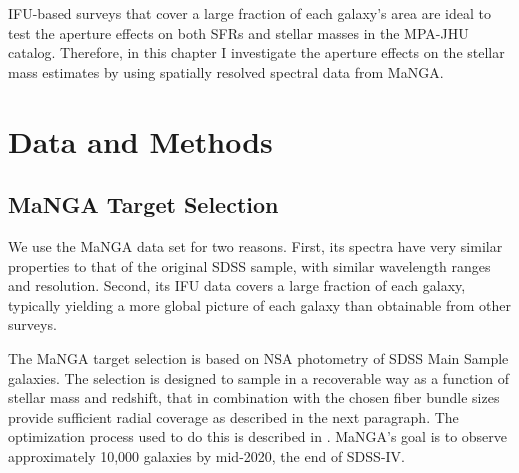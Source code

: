 
IFU-based surveys that cover a large fraction of each
galaxy's area are ideal to test the aperture 
effects on both SFRs and stellar masses in the MPA-JHU 
catalog. Therefore, in this chapter I investigate the aperture 
effects on the stellar mass estimates by using spatially 
resolved spectral data from MaNGA.\\


\section{Data and Methods}

\subsection{MaNGA Target Selection}
\label{mangadrp}

We use the MaNGA data set for two reasons. First,
its spectra have very similar properties to that of 
the original SDSS sample, with similar wavelength 
ranges and resolution. Second, its IFU data covers 
a large fraction of each galaxy, typically yielding 
a more global picture of each galaxy than obtainable
from other surveys. 

The MaNGA target selection is based on NSA photometry of 
SDSS Main Sample galaxies. The selection is designed to 
sample in a recoverable way as a function of stellar mass
and redshift, that in combination with the chosen fiber 
bundle sizes provide sufficient radial coverage as 
described  in the next paragraph.
The optimization process used to do this is described 
in \citet{2017AJ....154...86W}. MaNGA's goal is to 
observe approximately 10,000 galaxies by mid-2020,
the end of SDSS-IV.

